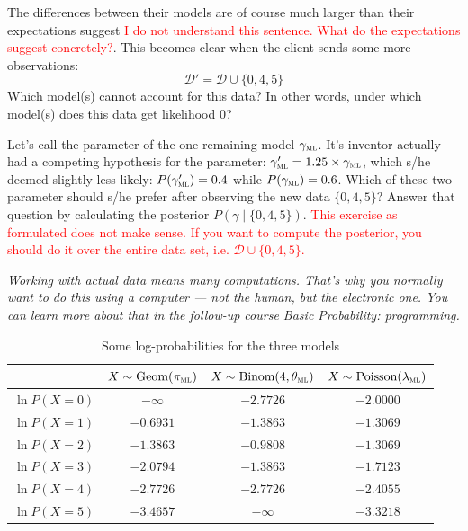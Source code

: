 \documentclass[a4paper,10pt,landscape,twocolumn]{scrartcl}
\newcommand{\philip}[1]{\textcolor{red}{#1}}
\begin{document}
\begin{exercise}
	\begin{subex}[0.5pt]
		The differences between their models are of course much larger than their expectations suggest \philip{I do not understand this sentence. What do the expectations suggest concretely?}. This becomes clear when the client sends some more observations:
		\[
			\mathcal D' = \mathcal D \cup \{ 0, 4, 5 \}
		\]
		Which model(s) cannot account for this data? In other words, under which model(s) does this data get likelihood 0?
	\end{subex}
	
	\begin{subex}[1pt]
	Let's call the parameter of the one remaining model	$\gamma_\textsc{ml}$. It's inventor actually had a competing hypothesis for the parameter: $\gamma_\textsc{ml}' = 1.25 \times \gamma_\textsc{ml}$, which s/he deemed slightly less likely: $P(\gamma_\textsc{ml}') = 0.4$ while $P(\gamma_\textsc{ml}) = 0.6$. Which of these two parameter should s/he prefer after observing the new data $\{ 0, 4, 5 \}$? Answer that question by calculating the posterior $P(\gamma \mid \{0, 4, 5\})$. \philip{This exercise
	as formulated does not make sense. If you want to compute the posterior, you should do it over the entire data set, i.e. $ \mathcal D \cup \{ 0, 4, 5 \} $.}
	\end{subex}
	
	\bigbreak\noindent
	\emph{Working with actual data means many computations. That's why you normally want to do this using a computer --- not the human, but the electronic one. You can learn more about that in the follow-up course \emph{Basic Probability: programming}.}
\end{exercise}

\begin{table}
\begin{tabular}{l c c c}
& 	$X \sim \text{Geom}(\pi_\textsc{ml})$
&	$X \sim \text{Binom}(4, \theta_\textsc{ml})$
&	$X \sim \text{Poisson}(\lambda_\textsc{ml})$ \\\hline\hline
$\ln P(X = 0)$ &$-\infty$ &$-2.7726$ &$-2.0000$ \\\hline
$\ln P(X = 1)$ &$-0.6931$ &$-1.3863$ &$-1.3069$ \\\hline
$\ln P(X = 2)$ &$-1.3863$ &$-0.9808$ &$-1.3069$ \\\hline
$\ln P(X = 3)$ &$-2.0794$ &$-1.3863$ &$-1.7123$ \\\hline
$\ln P(X = 4)$ &$-2.7726$ &$-2.7726$ &$-2.4055$ \\\hline
$\ln P(X = 5)$ &$-3.4657$ &$-\infty$ &$-3.3218$ \\\hline
\end{tabular}
\caption{Some log-probabilities for the three models \label{table}}
\end{table}
\end{document}
